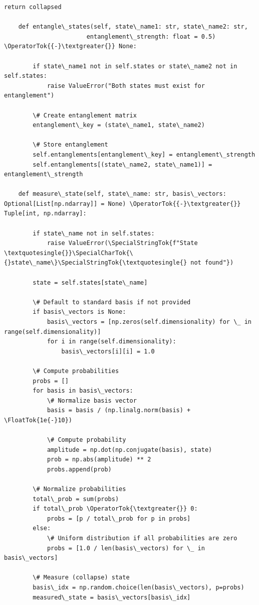 \documentclass[12pt]{article}
\begin{document}
\begin{lstlisting}[basicstyle=\ttfamily\small]
        return collapsed
    
    def entangle\_states(self, state\_name1: str, state\_name2: str, 
                       entanglement\_strength: float = 0.5) \OperatorTok{{-}\textgreater{}} None:

        if state\_name1 not in self.states or state\_name2 not in self.states:
            raise ValueError("Both states must exist for entanglement")
        
        \# Create entanglement matrix
        entanglement\_key = (state\_name1, state\_name2)
        
        \# Store entanglement
        self.entanglements[entanglement\_key] = entanglement\_strength
        self.entanglements[(state\_name2, state\_name1)] = entanglement\_strength
    
    def measure\_state(self, state\_name: str, basis\_vectors: Optional[List[np.ndarray]] = None) \OperatorTok{{-}\textgreater{}} Tuple[int, np.ndarray]:

        if state\_name not in self.states:
            raise ValueError(\SpecialStringTok{f"State \textquotesingle{}}\SpecialCharTok{\{}state\_name\}\SpecialStringTok{\textquotesingle{} not found"})
        
        state = self.states[state\_name]
        
        \# Default to standard basis if not provided
        if basis\_vectors is None:
            basis\_vectors = [np.zeros(self.dimensionality) for \_ in range(self.dimensionality)]
            for i in range(self.dimensionality):
                basis\_vectors[i][i] = 1.0
        
        \# Compute probabilities
        probs = []
        for basis in basis\_vectors:
            \# Normalize basis vector
            basis = basis / (np.linalg.norm(basis) + \FloatTok{1e{-}10})
            
            \# Compute probability
            amplitude = np.dot(np.conjugate(basis), state)
            prob = np.abs(amplitude) ** 2
            probs.append(prob)
        
        \# Normalize probabilities
        total\_prob = sum(probs)
        if total\_prob \OperatorTok{\textgreater{}} 0:
            probs = [p / total\_prob for p in probs]
        else:
            \# Uniform distribution if all probabilities are zero
            probs = [1.0 / len(basis\_vectors) for \_ in basis\_vectors]
        
        \# Measure (collapse) state
        basis\_idx = np.random.choice(len(basis\_vectors), p=probs)
        measured\_state = basis\_vectors[basis\_idx]
        

\end{lstlisting}
\end{document}

